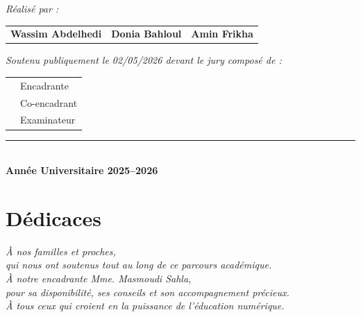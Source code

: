 \documentclass[12pt,a4paper]{report}
\begin{document}
\begin{titlepage}
\begin{center}
    {\large \textit{Réalisé par :}}\\[0.6cm]
    \begin{tabular}{>{\centering\arraybackslash}p{4.5cm}
                    >{\centering\arraybackslash}p{4.5cm}
                    >{\centering\arraybackslash}p{4.5cm}}
        \textbf{\large Wassim Abdelhedi} &
        \textbf{\large Donia Bahloul} &
        \textbf{\large Amin Frikha} \\
    \end{tabular}
\end{center}

\vfill

\begin{center}
{\large \textit{Soutenu publiquement le 02/05/2026 devant le jury composé de :}}\\[0.8cm]
\begin{tabular}{>{\raggedright\arraybackslash}p{6.5cm}
                >{\raggedleft\arraybackslash}p{4.5cm}}
{\Large \textbf{Mme. Sahla Masmoudi}} & {\Large Encadrante} \\[0.4cm]
{\Large \textbf{***************}}     & {\Large Co-encadrant} \\[0.4cm]
{\Large \textbf{***************}}     & {\Large Examinateur} \\
\end{tabular}
\end{center}

\vfill

\begin{center}
    \rule{4cm}{0.5pt}\\[0.3cm]
    \textbf{Année Universitaire 2025--2026}
\end{center}

\end{titlepage}


\chapter*{Dédicaces}

\vspace{2cm}
\begin{center}
\textit{\large À nos familles et proches,}\\[0.5cm]
\textit{qui nous ont soutenus tout au long de ce parcours académique.}\\[0.8cm]
\textit{À notre encadrante Mme. Masmoudi Sahla,}\\[0.5cm]
\textit{pour sa disponibilité, ses conseils et son accompagnement précieux.}\\[0.8cm]
\textit{À tous ceux qui croient en la puissance de l'éducation numérique.}
\end{center}
\end{document}
